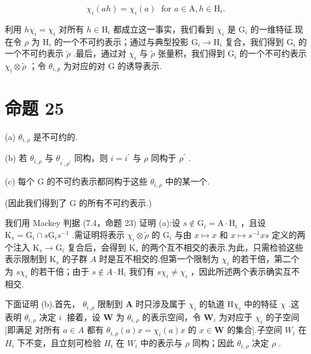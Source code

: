\documentclass[10pt]{article}
\begin{document}
\[
{\chi }_{i}\left( {ah}\right)  = {\chi }_{i}\left( a\right) \;\text{ for }a \in  \mathrm{A},h \in  {\mathrm{H}}_{i}.
\]

利用 \(h{\chi }_{i} = {\chi }_{i}\) 对所有 \(h \in  {\mathrm{H}}_{i}\) 都成立这一事实，我们看到 \({\chi }_{i}\) 是 \({\mathrm{G}}_{i}\) 的一维特征.现在令 \(\rho\) 为 \({\mathrm{H}}_{i}\) 的一个不可约表示；通过与典型投影 \({\mathrm{G}}_{i} \rightarrow  {\mathrm{H}}_{i}\) 复合，我们得到 \({\mathrm{G}}_{i}\) 的一个不可约表示 \(\widetilde{\rho }\) .最后，通过对 \({\chi }_{i}\) 与 \(\widetilde{\rho }\) 张量积，我们得到 \({\mathrm{G}}_{i}\) 的一个不可约表示 \({\chi }_{i} \otimes  \widetilde{\rho }\) ；令 \({\theta }_{i,p}\) 为对应的对 \(\mathrm{G}\) 的诱导表示.

\section*{命题 25}

(a) \({\theta }_{i,\rho }\) 是不可约的.

(b) 若 \({\theta }_{i,\rho }\) 与 \({\theta }_{{i}^{\prime },{\rho }^{\prime }}\) 同构，则 \(i = {i}^{\prime }\) 与 \(\rho\) 同构于 \({\rho }^{\prime }\) .

(c) 每个 \(\mathrm{G}\) 的不可约表示都同构于这些 \({\theta }_{i,\rho }\) 中的某一个.

(因此我们得到了 G 的所有不可约表示.)

我们用 Mackey 判据 (7.4，命题 23) 证明 (a):设 \(s \notin  {\mathrm{G}}_{i} = \mathrm{A} \cdot  {\mathrm{H}}_{i}\) ，且设 \({\mathrm{K}}_{s} = {\mathrm{G}}_{i} \cap  s{\mathrm{G}}_{i}{s}^{-1}\) .需证明将表示 \({\chi }_{i} \otimes  \widetilde{\rho }\) 的 \({\mathrm{G}}_{i}\) 与由 \(x \mapsto  x\) 和 \(x \mapsto  {s}^{-1}{xs}\) 定义的两个注入 \({\mathrm{K}}_{s} \rightarrow  {\mathrm{G}}_{i}\) 复合后，会得到 \({\mathrm{K}}_{s}\) 的两个互不相交的表示.为此，只需检验这些表示限制到 \({\mathrm{K}}_{s}\) 的子群 \(A\) 时是互不相交的.但第一个限制为 \({\chi }_{i}\) 的若干倍，第二个为 \(s{\chi }_{i}\) 的若干倍；由于 \(s \notin  A \cdot  {\mathrm{H}}_{i}\) 我们有 \(s{\chi }_{i} \neq  {\chi }_{i}\) ，因此所述两个表示确实互不相交.

下面证明 (b).首先， \({\theta }_{i,\rho }\) 限制到 \(\mathbf{A}\) 时只涉及属于 \({\chi }_{i}\) 的轨道 \(\mathrm{H}{\chi }_{i}\) 中的特征 \(\chi\) .这表明 \({\theta }_{i,\rho }\) 决定 \(i\) .接着，设 \(\mathbf{W}\) 为 \({\theta }_{i,\rho }\) 的表示空间，令 \({\mathbf{W}}_{i}\) 为对应于 \({\chi }_{i}\) 的子空间 [即满足 对所有 \(a \in  A\) 都有 \({\theta }_{i,\rho }\left( a\right) x = {\chi }_{i}\left( a\right) x\) 的 \(x \in  \mathbf{W}\) 的集合].子空间 \({W}_{i}\) 在 \({H}_{i}\) 下不变，且立刻可检验 \({H}_{i}\) 在 \({W}_{i}\) 中的表示与 \(\rho\) 同构；因此 \({\theta }_{i,\rho }\) 决定 \(\rho\) .
\end{document}
